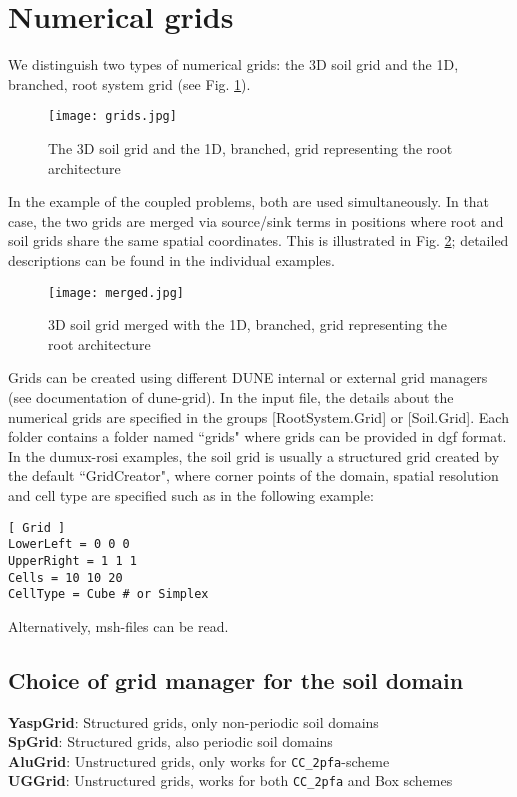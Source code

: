 \chapter*{Numerical grids}
We distinguish two types of numerical grids: the 3D soil grid and the 1D, branched, root system grid (see Fig. \ref{fig:grids}). 

\begin{figure}[ht]
	\centering
  \texttt{[image: grids.jpg]}
	\caption{The 3D soil grid and the 1D, branched, grid representing the root architecture}
	\label{fig:grids}
\end{figure}

In the example of the coupled problems, both are used simultaneously. In that case, the two grids are merged via source/sink terms in positions where root and soil grids share the same spatial coordinates. This is illustrated in Fig. \ref{fig:merged}; detailed descriptions can be found in the individual examples. 
 
\begin{figure}[ht]
	\centering
  \texttt{[image: merged.jpg]}
	\caption{3D soil grid merged with the 1D, branched, grid representing the root architecture}
	\label{fig:merged}
\end{figure}

Grids can be created using different DUNE internal or external grid managers (see documentation of dune-grid). In the input file, the details about the numerical grids are specified in the groups [RootSystem.Grid] or [Soil.Grid]. Each folder contains a folder named ``grids" where grids can be provided in dgf format. In the dumux-rosi examples, the soil grid is usually a structured grid created by the default ``GridCreator", where corner points of the domain, spatial resolution and cell type are specified such as in the following example: 

\begin{lstlisting}
[ Grid ]
LowerLeft = 0 0 0
UpperRight = 1 1 1
Cells = 10 10 20
CellType = Cube # or Simplex
\end{lstlisting}

Alternatively, msh-files can be read. 

\section*{Choice of grid manager for the soil domain}
\textbf{YaspGrid}: Structured grids, only non-periodic soil domains\\
\textbf{SpGrid}: Structured grids, also periodic soil domains\\
\textbf{AluGrid}: Unstructured grids, only works for \texttt{CC_2pfa}-scheme\\
\textbf{UGGrid}: Unstructured grids, works for both \texttt{CC_2pfa} and Box schemes\\

